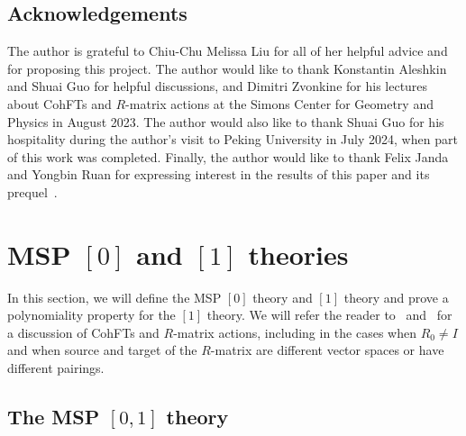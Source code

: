 \documentclass[10pt]{amsart}
\theoremstyle{definition}
\theoremstyle{remark}
\theoremstyle{plain}
\theoremstyle{definition}
\theoremstyle{remark}
\newcommand{\1}{\mathbf{1}}
\newcommand{\2}{\mathbf{2}}
\newcommand{\3}{\mathbf{3}}
\numberwithin{equation}{section}
\begin{document}
\subsection*{Acknowledgements}%
\label{sub:Acknowledgements}

The author is grateful to Chiu-Chu Melissa Liu for all of her helpful advice and for proposing this project. The author would like to thank Konstantin Aleshkin and Shuai Guo for helpful discussions, and Dimitri Zvonkine for his lectures about CohFTs and $R$-matrix actions at the Simons Center for Geometry and Physics in August 2023. The author would also like to thank Shuai Guo for his hospitality during the author's visit to Peking University in July 2024, when part of this work was completed. Finally, the author would like to thank Felix Janda and Yongbin Ruan for expressing interest in the results of this paper and its prequel~\cite{polynomiality}.

\section{MSP $[0]$ and $[1]$ theories}%
\label{sec:MSP 0 and 1 theories}

In this section, we will define the MSP $[0]$ theory and $[1]$ theory and prove a polynomiality property for the $[1]$ theory. We will refer the reader to~\cite{relationsvia3spin} and~\cite[\S 2, Appendix C]{nmsp3} for a discussion of CohFTs and $R$-matrix actions, including in the cases when $R_0 \neq I$ and when source and target of the $R$-matrix are different vector spaces or have different pairings.

\subsection{The MSP $[0,1]$ theory}%
\label{sub:The MSP theory}
\end{document}
